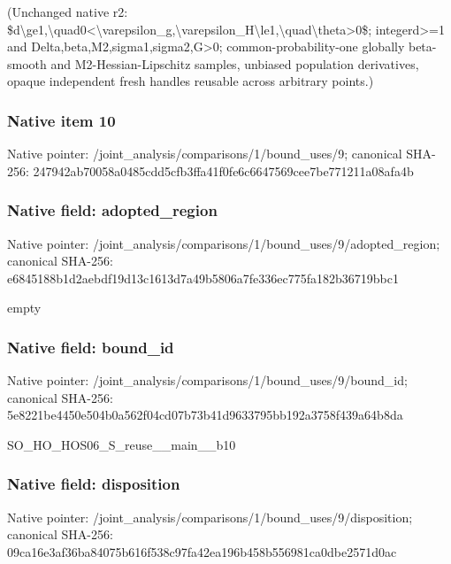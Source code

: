 \documentclass[10pt,a4paper]{article}
\begin{document}
\begingroup\raggedright\sloppy (Unchanged native r2:\allowbreak{} \$d\textbackslash{}ge1,\allowbreak{}\textbackslash{}quad0<\textbackslash{}varepsilon\_\allowbreak{}g,\allowbreak{}\textbackslash{}varepsilon\_\allowbreak{}H\textbackslash{}le1,\allowbreak{}\textbackslash{}quad\textbackslash{}theta>0\$;\allowbreak{} integerd>=\allowbreak{}1 and Delta,\allowbreak{}beta,\allowbreak{}M2,\allowbreak{}sigma1,\allowbreak{}sigma2,\allowbreak{}G>0;\allowbreak{} common-probability-one globally beta-smooth and M2-Hessian-Lipschitz samples,\allowbreak{} unbiased population derivatives,\allowbreak{} opaque independent fresh handles reusable across arbitrary points.)\par\endgroup

\subsubsection{Native item 10}
Native pointer: /joint\_\allowbreak{}analysis/comparisons/1/bound\_\allowbreak{}uses/9; canonical SHA-256: 247942ab70058a0485cdd5cfb3ffa41f0fe6c6647569cee7be771211a08afa4b

\subsubsection{Native field: adopted\_\allowbreak{}region}
Native pointer: /joint\_\allowbreak{}analysis/comparisons/1/bound\_\allowbreak{}uses/9/adopted\_\allowbreak{}region; canonical SHA-256: e6845188b1d2aebdf19d13c1613d7a49b5806a7fe336ec775fa182b36719bbc1

\begingroup\raggedright\sloppy empty\par\endgroup

\subsubsection{Native field: bound\_\allowbreak{}id}
Native pointer: /joint\_\allowbreak{}analysis/comparisons/1/bound\_\allowbreak{}uses/9/bound\_\allowbreak{}id; canonical SHA-256: 5e8221be4450e504b0a562f04cd07b73b41d9633795bb192a3758f439a64b8da

\begingroup\raggedright\sloppy SO\_\allowbreak{}HO\_\allowbreak{}HOS06\_\allowbreak{}S\_\allowbreak{}reuse\_\allowbreak{}\_\allowbreak{}main\_\allowbreak{}\_\allowbreak{}b10\par\endgroup

\subsubsection{Native field: disposition}
Native pointer: /joint\_\allowbreak{}analysis/comparisons/1/bound\_\allowbreak{}uses/9/disposition; canonical SHA-256: 09ca16e3af36ba84075b616f538c97fa42ea196b458b556981ca0dbe2571d0ac
\end{document}
